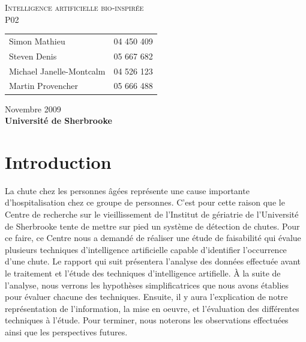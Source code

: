 \documentclass[12pt,letterpaper]{article}
\begin{document}
\renewcommand{\labelitemi}{$\bullet$}
\newcommand{\unit}[1]{\ \mathrm{#1}}
\newcommand{\degree}{\ensuremath{^\circ}}

\thispagestyle{empty}
\begin{center}
	\vspace{20pt}
	\large{\textsc{
		Intelligence artificielle bio-inspirée\\
	}}
	\vspace{20pt}
	\large{\textsc{
		P02
	}}
	\vfill
	\begin{tabular}{ll}
      Simon Mathieu & 04 450 409 \\
      Steven Denis & 05 667 682 \\
      Michael Janelle-Montcalm & 04 526 123 \\
      Martin Provencher &	05 666 488 \\
	\end{tabular}
	\vfill
	Novembre 2009 \\
	\textbf{Université de Sherbrooke}
	\vspace{20pt}
\end{center}
\clearpage
\begin{spacing}{0.1}
\tableofcontents
\end{spacing}
\clearpage

\section{Introduction} %
La chute chez les personnes âgées représente une cause importante d'hospitalisation chez ce groupe de personnes. C'est pour cette raison que le Centre de recherche sur le vieillissement de l'Institut de gériatrie de l'Université de Sherbrooke tente de mettre sur pied un système de détection de chutes. Pour ce faire, ce Centre nous a demandé de réaliser une étude de faisabilité qui évalue plusieurs techniques d'intelligence artificielle capable d'identifier l'occurrence d'une chute. Le rapport qui suit présentera l'analyse des données effectuée avant le traitement et l'étude des techniques d'intelligence artifielle. À la suite de l'analyse, nous verrons les hypothèses simplificatrices que nous avons établies pour évaluer chacune des techniques. Ensuite, il y aura l'explication de notre représentation de l'information, la mise en oeuvre, et l'évaluation des différentes techniques à l'étude. Pour terminer, nous noterons les observations effectuées ainsi que les perspectives futures.
\end{document}
